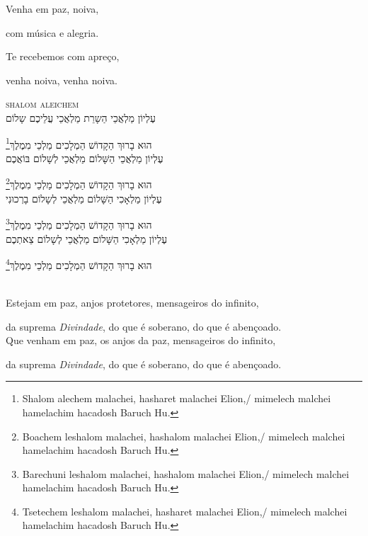 Venha em paz, noiva,

com música e alegria.

Te recebemos com apreço,

venha noiva, venha noiva.

\movetoevenpage
\raggedleft
{}

\vspace*{1cm}

\textsc{shalom aleichem}\\[15pt]

עֶלְיוֹן מַלְאֲכֵי הַשָרֵת מַלְאֲכֵי עֲלֵיכֶם שָלוֹם

הוּא בָרוּךְ הַקָדוֹשׁ הַמְלָכִים מַלְכֵי מִמֶלֶךְ\footnote{Shalom alechem malachei, hasharet malachei Elion,/
mimelech malchei hamelachim hacadosh Baruch Hu.}\\[10pt]

עֶלְיוֹן מַלְאֲכֵי הַשָּׁלוֹם מַלְאֲכֵי לְשָׁלוֹם בּוֹאֲכֶם

הוּא בָרוּךְ הַקָדוֹשׁ הַמְלָכִים מַלְכֵי מִמֶלֶךְ\footnote{Boachem leshalom malachei, hashalom malachei Elion,/
mimelech malchei hamelachim hacadosh Baruch Hu.}\\[10pt]

עֶלְיוֹן מַלְאָכִי הַשָּׁלוֹם מַלְאֲכֵי לְשָלוֹם בָרְכוּנִי

הוּא בָרוּךְ הַקָדוֹשׁ הַמְלָכִים מַלְכֵי מִמֶלֶךְ\footnote{Barechuni leshalom malachei, hashalom malachei Elion,/
mimelech malchei hamelachim hacadosh Baruch Hu.}\\[10pt] 

עֶלְיוֹן מַלְאָכִי הַשָּׁלוֹם מַלְאֲכֵי לְשָלוֹם צֵאתְכֶם 

הוּא בָרוּךְ הַקָדוֹשׁ הַמְלָכִים מַלְכֵי מִמֶלֶךְ\footnote{Tsetechem leshalom malachei, hasharet malachei Elion,/
mimelech malchei hamelachim hacadosh Baruch Hu.} 


\movetooddpage
\raggedright

\vspace*{1cm}

\textsc{}\\[15pt]

Estejam em paz, anjos protetores, mensageiros do infinito,

da suprema \emph{Divindade},  do que é soberano, do que é \qb{}abençoado.\\[10pt]

Que venham em paz, os anjos da paz, mensageiros do \qb{}infinito,

da suprema \emph{Divindade}, do que é soberano, do que é \qb{}abençoado.\\[10pt]

